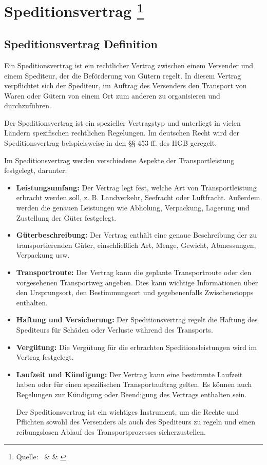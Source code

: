 
    \chapter[Speditionsvertrag]{Speditionsvertrag \footnote{Quelle:~\cite{Handelsrecht} \& \cite{ADSp} \& \cite{Speditionsbetriebslehre_und_Logistik}}}

    \section{Speditionsvertrag Definition}

    Ein Speditionsvertrag ist ein rechtlicher Vertrag zwischen einem Versender  und einem Spediteur, der die Beförderung von Gütern regelt. In diesem Vertrag verpflichtet sich der Spediteur, im Auftrag des Versenders den Transport von Waren oder Gütern von einem Ort zum anderen zu organisieren und durchzuführen.

    Der Speditionsvertrag ist ein spezieller Vertragstyp und unterliegt in vielen Ländern spezifischen rechtlichen Regelungen. Im deutschen Recht wird der Speditionsvertrag beispielsweise in den §§ 453 ff. des HGB geregelt.

    Im Speditionsvertrag werden verschiedene Aspekte der Transportleistung festgelegt, darunter:
    \begin{itemize}
        \item \textbf{Leistungsumfang:} Der Vertrag legt fest, welche Art von Transportleistung erbracht werden soll, z. B. Landverkehr, Seefracht oder Luftfracht. Außerdem werden die genauen Leistungen wie Abholung, Verpackung, Lagerung und Zustellung der Güter festgelegt.
        \item \textbf{Güterbeschreibung:} Der Vertrag enthält eine genaue Beschreibung der zu transportierenden Güter, einschließlich Art, Menge, Gewicht, Abmessungen, Verpackung usw.
        \item \textbf{Transportroute:} Der Vertrag kann die geplante Transportroute oder den vorgesehenen Transportweg angeben. Dies kann wichtige Informationen über den Ursprungsort, den Bestimmungsort und gegebenenfalls Zwischenstopps enthalten.
        \item \textbf{Haftung und Versicherung:} Der Speditionsvertrag regelt die Haftung des Spediteurs für Schäden oder Verluste während des Transports.
        \item \textbf{Vergütung:} Die Vergütung für die erbrachten Speditionsleistungen wird im Vertrag festgelegt.
        \item \textbf{Laufzeit und Kündigung:} Der Vertrag kann eine bestimmte Laufzeit haben oder für einen spezifischen Transportauftrag gelten. Es können auch Regelungen zur Kündigung oder Beendigung des Vertrags enthalten sein.

    Der Speditionsvertrag ist ein wichtiges Instrument, um die Rechte und Pflichten sowohl des Versenders als auch des Spediteurs zu regeln und einen reibungslosen Ablauf des Transportprozesses sicherzustellen.
\end{itemize}
